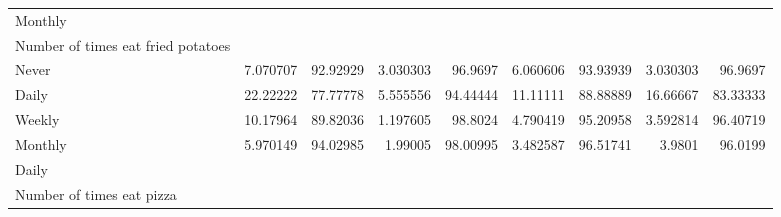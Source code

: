 \documentclass{article}
\begin{document}
\begin{tabular}{lllllllll}
\multicolumn{1}{l}{\hspace{3em}Monthly} &
  \multicolumn{1}{|r}{} &
  \multicolumn{1}{r}{} &
  \multicolumn{1}{r}{} &
  \multicolumn{1}{r}{} &
  \multicolumn{1}{r}{} &
  \multicolumn{1}{r}{} &
  \multicolumn{1}{r}{} &
  \multicolumn{1}{r}{} \\
\multicolumn{1}{l}{\hspace{4em}Number of times eat fried potatoes} &
  \multicolumn{1}{|r}{} &
  \multicolumn{1}{r}{} &
  \multicolumn{1}{r}{} &
  \multicolumn{1}{r}{} &
  \multicolumn{1}{r}{} &
  \multicolumn{1}{r}{} &
  \multicolumn{1}{r}{} &
  \multicolumn{1}{r}{} \\
\multicolumn{1}{l}{\hspace{5em}Never} &
  \multicolumn{1}{|r}{7.070707} &
  \multicolumn{1}{r}{92.92929} &
  \multicolumn{1}{r}{3.030303} &
  \multicolumn{1}{r}{96.9697} &
  \multicolumn{1}{r}{6.060606} &
  \multicolumn{1}{r}{93.93939} &
  \multicolumn{1}{r}{3.030303} &
  \multicolumn{1}{r}{96.9697} \\
\multicolumn{1}{l}{\hspace{5em}Daily} &
  \multicolumn{1}{|r}{22.22222} &
  \multicolumn{1}{r}{77.77778} &
  \multicolumn{1}{r}{5.555556} &
  \multicolumn{1}{r}{94.44444} &
  \multicolumn{1}{r}{11.11111} &
  \multicolumn{1}{r}{88.88889} &
  \multicolumn{1}{r}{16.66667} &
  \multicolumn{1}{r}{83.33333} \\
\multicolumn{1}{l}{\hspace{5em}Weekly} &
  \multicolumn{1}{|r}{10.17964} &
  \multicolumn{1}{r}{89.82036} &
  \multicolumn{1}{r}{1.197605} &
  \multicolumn{1}{r}{98.8024} &
  \multicolumn{1}{r}{4.790419} &
  \multicolumn{1}{r}{95.20958} &
  \multicolumn{1}{r}{3.592814} &
  \multicolumn{1}{r}{96.40719} \\
\multicolumn{1}{l}{\hspace{5em}Monthly} &
  \multicolumn{1}{|r}{5.970149} &
  \multicolumn{1}{r}{94.02985} &
  \multicolumn{1}{r}{1.99005} &
  \multicolumn{1}{r}{98.00995} &
  \multicolumn{1}{r}{3.482587} &
  \multicolumn{1}{r}{96.51741} &
  \multicolumn{1}{r}{3.9801} &
  \multicolumn{1}{r}{96.0199} \\
\multicolumn{1}{l}{\hspace{1em}Daily} &
  \multicolumn{1}{|r}{} &
  \multicolumn{1}{r}{} &
  \multicolumn{1}{r}{} &
  \multicolumn{1}{r}{} &
  \multicolumn{1}{r}{} &
  \multicolumn{1}{r}{} &
  \multicolumn{1}{r}{} &
  \multicolumn{1}{r}{} \\
\multicolumn{1}{l}{\hspace{2em}Number of times eat pizza} &

\end{tabular}
\end{document}
